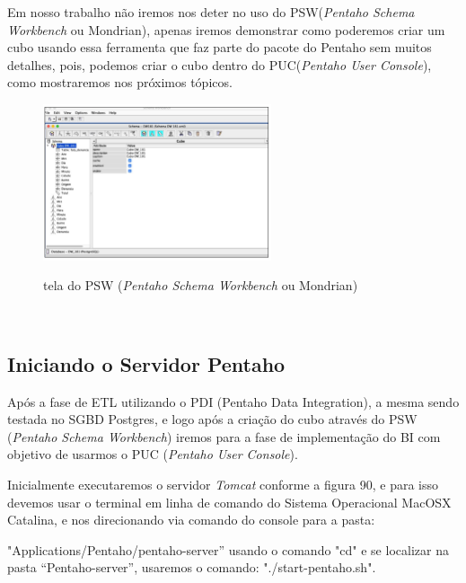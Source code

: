 Em nosso trabalho n\~{a}o iremos nos deter no uso do PSW(\textit{Pentaho Schema Workbench} ou Mondrian), apenas iremos demonstrar como poderemos criar um cubo usando essa ferramenta que faz parte do pacote do Pentaho sem muitos detalhes, pois, podemos criar o cubo dentro do PUC(\textit{Pentaho User Console}), como mostraremos nos pr\'oximos t\'opicos.

\begin{figure}[H]
	\vspace*{0,2cm}
    \centering
    \caption{tela do PSW (\textit{Pentaho Schema Workbench} ou Mondrian)}
    \includegraphics[width=0.6\textwidth]{./04-figuras/figura-pentaho-psw}
    \label{fig:ilustfigpentaho-psw}
\end{figure}
\vspace*{-0,9cm}
{\raggedright {}} \\

\subsection{Iniciando o Servidor Pentaho}

Ap\'os a fase de ETL utilizando o PDI (Pentaho Data Integration), a mesma sendo testada no SGBD Postgres, e logo ap\'os a cria\c{c}\~{a}o do cubo atrav\'{e}s do PSW (\textit{Pentaho Schema Workbench}) iremos para a fase de implementa\c{c}\~{a}o do BI com objetivo de usarmos o PUC (\textit{Pentaho User Console}).

Inicialmente executaremos o servidor \textit{Tomcat} conforme a figura 90, e para isso devemos usar o terminal em linha de comando do Sistema Operacional MacOSX Catalina, e nos direcionando via comando do console para a pasta:

"Applications/Pentaho/pentaho-server'' usando o comando "cd" e se localizar na pasta ``Pentaho-server'', usaremos o comando: "./start-pentaho.sh".

